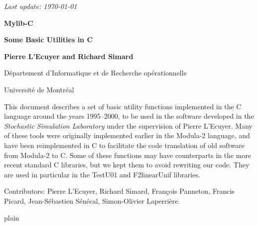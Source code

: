 \documentclass[12pt]{article}
\begin{document}
\begin{titlepage}

\null 
\begin {flushright} \it Last update: \today \end {flushright}

\vfill
{ \centerline {\Large\bf Mylib-C }\bigskip\bigskip
  \centerline {\large\bf Some Basic Utilities in C }}
\vfill

\centerline {{\bf Pierre L'Ecuyer and Richard Simard}}
\medskip
\centerline {D\'epartement d'Informatique et de Recherche op\'erationnelle}
\centerline {Universit\'e de Montr\'eal}

\vfill
\medskip

This document describes a set of basic utility functions implemented in the 
C language around the years 1995--2000, to be used in the software developed in the
\emph{Stochastic Simulation Laboratory} under the supervision of Pierre L'Ecuyer.
Many of these tools were originally implemented earlier in the Modula-2 language,
and have been reimplemented in C to facilitate the code translation of old 
software from Modula-2 to C.  Some of these functions may have counterparts in
the more recent standard C libraries, but we kept them to avoid rewriting our code.
They are used in particular in the TestU01 and F2linearUnif libraries.

Contributors:  Pierre L'Ecuyer, Richard Simard, Fran\c cois Panneton,
Francis Picard, Jean-S\'ebastien S\'en\'ecal, Simon-Olivier Laperri\`ere.

\vfill
\end{titlepage}

\tableofcontents
{}

\iffalse 













\fi


\clearpage
\clearpage
\clearpage
\clearpage
\clearpage
\clearpage
\clearpage
\clearpage
\clearpage
\clearpage
\clearpage
\clearpage
\clearpage

 {plain}

\end{document}
